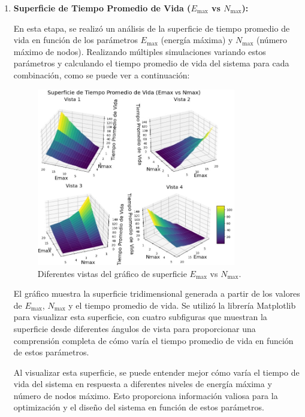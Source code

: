 \begin{enumerate}[label=\arabic*.]
\item \textbf{Superficie de Tiempo Promedio de Vida ($E_{\text{max}}$ vs $N_{\text{max}}$):}

En esta etapa, se realizó un análisis de la superficie de tiempo promedio de vida en función de los parámetros $E_{\text{max}}$ (energía máxima) y $N_{\text{max}}$ (número máximo de nodos). Realizando múltiples simulaciones variando estos parámetros y calculando el tiempo promedio de vida del sistema para cada combinación, como se puede ver a continuación:
\newpage

\begin{figure}[H]
    \centering
    \includegraphics[width=0.82\textwidth]{imagenes/mmpp6.1.jpg}
    \caption{Diferentes vistas del gráfico de superficie $E_{\text{max}}$ vs $N_{\text{max}}$.}
\end{figure}

El gráfico muestra la superficie tridimensional generada a partir de los valores de $E_{\text{max}}$, $N_{\text{max}}$ y el tiempo promedio de vida. Se utilizó la librería Matplotlib para visualizar esta superficie, con cuatro subfiguras que muestran la superficie desde diferentes ángulos de vista para proporcionar una comprensión completa de cómo varía el tiempo promedio de vida en función de estos parámetros.

Al visualizar esta superficie, se puede entender mejor cómo varía el tiempo de vida del sistema en respuesta a diferentes niveles de energía máxima y número de nodos máximo. Esto proporciona información valiosa para la optimización y el diseño del sistema en función de estos parámetros.


\end{enumerate}
